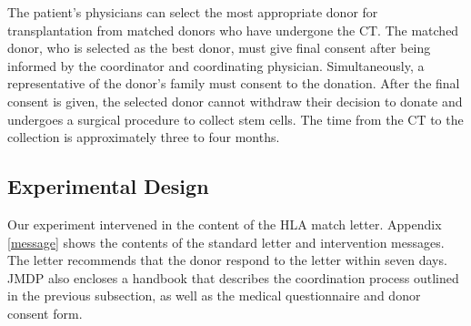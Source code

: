 \documentclass [12pt, a4paper]{article}
\begin{document}
The patient's physicians can select the most appropriate donor for transplantation from matched donors who have undergone the CT. The matched donor, who is selected as the best donor, must give final consent after being informed by the coordinator and coordinating physician. Simultaneously, a representative of the donor's family must consent to the donation. After the final consent is given, the selected donor cannot withdraw their decision to donate and undergoes a surgical procedure to collect stem cells. The time from the CT to the collection is approximately three to four months.

\hypertarget{design}{%
\subsection{Experimental Design}\label{design}}

Our experiment intervened in the content of the HLA match letter. Appendix \ref{message} shows the contents of the standard letter and intervention messages. The letter recommends that the donor respond to the letter within seven days. JMDP also encloses a handbook that describes the coordination process outlined in the previous subsection, as well as the medical questionnaire and donor consent form.
\end{document}
